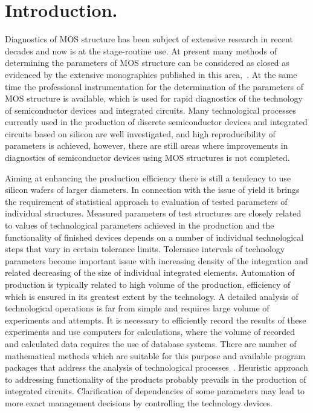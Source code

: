 \chapter{Introduction.}\label{Introduction}

Diagnostics of MOS structure has been subject of extensive research in
recent decades and now is at the stage-routine use. At present many
methods of determining the parameters of MOS structure can be
considered as closed as evidenced by the extensive monographies
published in this area,~\cite{I.1, I.2, I.3, I.4}. At the same time
the professional instrumentation for the determination of the
parameters of MOS structure is available, which is used for rapid
diagnostics of the technology of semiconductor devices and integrated
circuits. Many technological processes currently used in the
production of discrete semiconductor devices and integrated circuits
based on silicon are well investigated, and high reproducibility of
parameters is achieved, however, there are still areas where
improvements in diagnostics of semiconductor devices using MOS
structures is not completed.

Aiming at enhancing the production efficiency there is still a
tendency to use silicon wafers of larger diameters. In connection with
the issue of yield it brings the requirement of statistical approach
to evaluation of tested parameters of individual structures. Measured
parameters of test structures are closely related to values of
technological parameters achieved in the production and the
functionality of finished devices depends on a number of individual
technological steps that vary in certain tolerance limits. Tolerance
intervals of technology parameters become important issue with
increasing density of the integration and related decreasing of the
size of individual integrated elements. Automation of production is
typically related to high volume of the production, efficiency of
which is ensured in its greatest extent by the technology. A detailed
analysis of technological operations is far from simple and requires
large volume of experiments and attempts. It is necessary to
efficiently record the results of these experiments and use computers
for calculations, where the volume of recorded and calculated data
requires the use of database systems. There are number of mathematical
methods which are suitable for this purpose and available program
packages that address the analysis of technological
processes~\cite{I.5}. Heuristic approach to addressing functionality
of the products probably prevails in the production of integrated
circuits. Clarification of dependencies of some parameters may lead to
more exact management decisions by controlling the technology devices.

